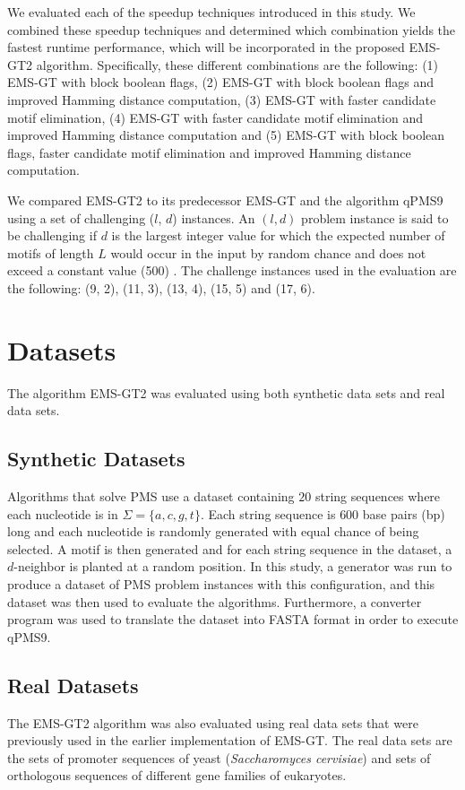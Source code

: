 We evaluated each of the speedup techniques introduced in this study. We combined these speedup techniques and determined which combination yields the fastest runtime performance, which will be incorporated in the proposed EMS-GT2 algorithm. Specifically, these different combinations are the following: (1) EMS-GT with block boolean flags, (2) EMS-GT with block boolean flags and improved Hamming distance computation, (3) EMS-GT with faster candidate motif elimination, (4) EMS-GT with faster candidate motif elimination and improved Hamming distance computation and (5) EMS-GT with block boolean flags, faster candidate motif elimination and improved Hamming distance computation. 

We compared EMS-GT2 to its predecessor EMS-GT and the algorithm qPMS9 using a set of challenging ($l$, $d$) instances. An $(l, d)$ problem instance is said to be challenging if $d$ is the largest integer value for which the expected number of motifs of length $L$ would occur in the input by random chance and does not exceed a constant value (500) \cite{pms2015}. The challenge instances used in the evaluation are the following: (9, 2), (11, 3), (13, 4), (15, 5) and (17, 6).

\section{Datasets}

The algorithm EMS-GT2 was evaluated using both synthetic data sets and real data sets.

\subsection{Synthetic Datasets}
Algorithms that solve PMS \cite{pevzner2000combinatorial, pms2014, pms2015} use a dataset containing $20$ string sequences where each nucleotide is in $\Sigma = \{a, c, g, t\}$. Each string sequence is $600$ base pairs (bp) long and each nucleotide is randomly generated with equal chance of being selected. A motif is then generated and for each string sequence in the dataset, a $d$-neighbor is planted at a random position. In this study, a generator was run to produce a dataset of PMS problem instances with this configuration, and this dataset was then used to evaluate the algorithms. Furthermore, a converter program was used to translate the dataset into FASTA format in order to execute qPMS9.


\subsection{Real Datasets}

The EMS-GT2 algorithm was also evaluated using real data sets that were previously used in the earlier implementation of EMS-GT. The real data sets are the sets of promoter sequences of yeast (\textit{Saccharomyces cervisiae}) \cite{zhu1999scpd} and sets of orthologous sequences of different gene families of eukaryotes.



